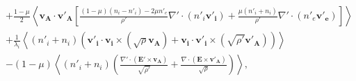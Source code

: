 \begin{eqnarray}
  &&+ \frac{1-\mu}{2}\left< \boldsymbol{v_A} \cdot \boldsymbol{v'_{A}} \left[\frac{\left(1-\mu\right)\left(n_i - n'_i\right) -2 \mu n'_e  }{\rho'}\nabla' \cdot \left(n'_i \boldsymbol{v'_i}\right)+ \frac{ \mu \left(n'_i + n_i\right) }{\rho'}\nabla' \cdot \left(n'_e \boldsymbol{v'_e}\right)\right]  \right>\nonumber \\ %
  &&+ \frac{1}{\lambda_i} \left<\left(n'_i + n_i\right)\left(  \boldsymbol{v'_i} \cdot \boldsymbol{v_i} \times \left(\sqrt{\rho}\boldsymbol{v_A}\right) +  \boldsymbol{v_i} \cdot \boldsymbol{v'_i} \times \left( \sqrt{\rho'}\boldsymbol{v'_A}\right)\right) \right>\nonumber\\ %
  &&- \left(1-\mu\right)\left< \left(n'_i + n_i\right)  \left( \frac{ \nabla' \cdot \left(\boldsymbol{E'}\times \boldsymbol{v_A}\right) }{\sqrt{\rho'}} + \frac{\nabla \cdot \left(  \boldsymbol{E}\times \boldsymbol{v'_A} \right) }{\sqrt{\rho}}\right)\right> ,%
 \end{eqnarray}   %

